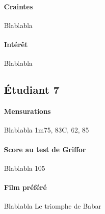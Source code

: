 		\paragraph*{Craintes}
			Blablabla
		\paragraph*{Intérêt}
			Blablabla	
	
	\subsection{Étudiant 7}
		\paragraph*{Mensurations}
			Blablabla 1m75, 83C, 62, 85
		\paragraph*{Score au test de Griffor}
			Blablabla 105
		\paragraph*{Film préféré}
			Blablabla Le triomphe de Babar
